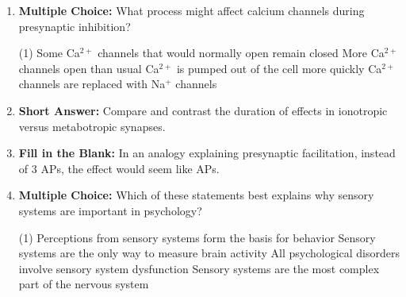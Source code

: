 \begin{enumerate}[label=\textbf{Q2.8.\arabic*}]
      \item \textbf{Multiple Choice:} What process might affect calcium channels during presynaptic inhibition?
            \begin{tasks}[label=(\Alph*), label-width=1.5em, item-indent=1.7em](1)
                  \task Some Ca\(^{2+}\) channels that would normally open remain closed
                  \task More Ca\(^{2+}\) channels open than usual
                  \task Ca\(^{2+}\) is pumped out of the cell more quickly
                  \task Ca\(^{2+}\) channels are replaced with Na\(^{+}\) channels
            \end{tasks}
            
      \item \textbf{Short Answer:} Compare and contrast the duration of effects in ionotropic versus metabotropic synapses. \\
            
      \item \textbf{Fill in the Blank:} In an analogy explaining presynaptic facilitation, instead of 3 APs, the effect would seem like \underline{\hspace{3cm}} APs. \\

\newpage

      \item \textbf{Multiple Choice:} Which of these statements best explains why sensory systems are important in psychology?
            \begin{tasks}[label=(\Alph*), label-width=1.5em, item-indent=1.7em](1)
                  \task Perceptions from sensory systems form the basis for behavior
                  \task Sensory systems are the only way to measure brain activity
                  \task All psychological disorders involve sensory system dysfunction
                  \task Sensory systems are the most complex part of the nervous system
            \end{tasks}
            

\end{enumerate}
